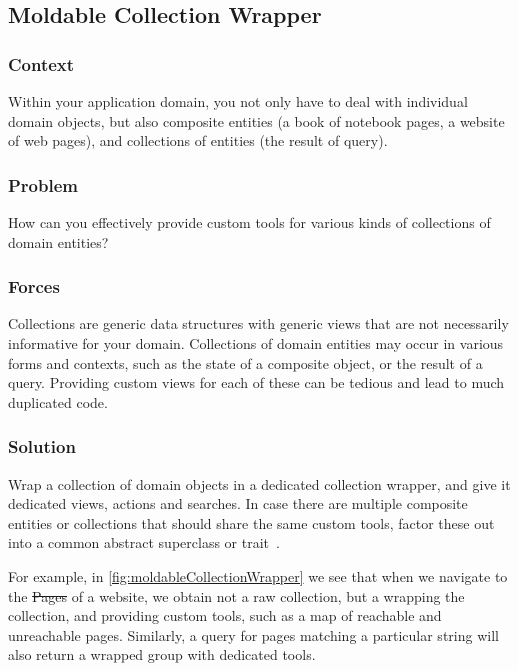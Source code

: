 \documentclass[sigconf]{acmart}
\newcommand\on[1]{\nbc{ON}{#1}{olive}} %
\begin{document}
\subsection*{Moldable Collection Wrapper}\label{pat:collectionWrapper}

\subsubsection*{Context}
Within your application domain, you not only have to deal with individual domain objects, but also composite entities (\eg a book of notebook pages, a website of web pages), and collections of entities (\eg the result of query).

\subsubsection*{Problem}
How can you effectively provide custom tools for various kinds of collections of domain entities?

\subsubsection*{Forces}
Collections are generic data structures with generic views that are not necessarily informative for your domain.
Collections of domain entities may occur in various forms and contexts, such as the state of a composite object, or the result of a query.
Providing custom views for each of these can be tedious and lead to much duplicated code.

\subsubsection*{Solution}
Wrap a collection of domain objects in a dedicated collection wrapper, and give it dedicated views, actions and searches.
In case there are multiple composite entities or collections that should share the same custom tools, factor these out into a common abstract superclass or trait~\cite{Duca06b}.

For example, in \autoref{fig:moldableCollectionWrapper} we see that when we navigate to the \st{Pages} of a website, we obtain not a raw collection, but a  wrapping the collection, and providing custom tools, such as a map of reachable and unreachable pages.
Similarly, a query for pages matching a particular string will also return a wrapped group with dedicated tools.
\end{document}
